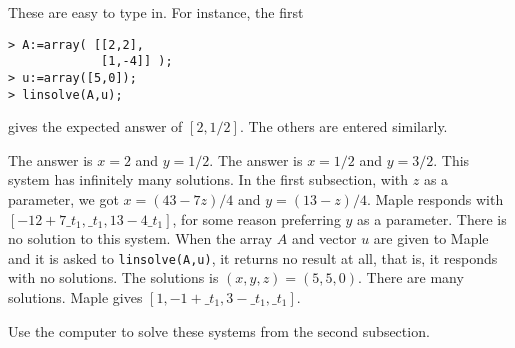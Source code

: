 \begin{exercises}
\begin{exparts*}
            \)
    \end{exparts*}
    \begin{answer}
      These are easy to type in.
      For instance, the first  
\begin{indented}{\small
\begin{verbatim}
> A:=array( [[2,2],
             [1,-4]] );
> u:=array([5,0]);
> linsolve(A,u);
\end{verbatim}
}\end{indented}
      gives the expected answer of $[2,1/2]$.
      The others are entered similarly.
      \begin{exparts}
        \partsitem The answer is \( x=2 \) and \( y=1/2 \).
        \partsitem The answer is \( x=1/2 \) and \( y=3/2 \). 
        \partsitem This system has infinitely many solutions.
           In the first subsection, with $z$ as a parameter, 
           we got $x=(43-7z)/4$ and $y=(13-z)/4$.
           Maple responds with $[-12+7\_t_1,\_t_1,13-4\_t_1]$,
           for some reason preferring $y$ as a parameter.
        \partsitem There is no solution to this system.
           When the array $A$ and vector $u$ are given to Maple
           and it is asked to \texttt{linsolve(A,u)}, 
           it returns no result at all, that is, it responds with
           no solutions.
        \partsitem The solutions is \( (x,y,z)=(5,5,0) \).
        \partsitem There are many solutions.
           Maple gives $[1,-1+\_t_1,3-\_t_1,\_t_1]$.
      \end{exparts}
    \end{answer}
  \item 
    Use the computer to solve these systems from the second subsection.
\end{exercises}
